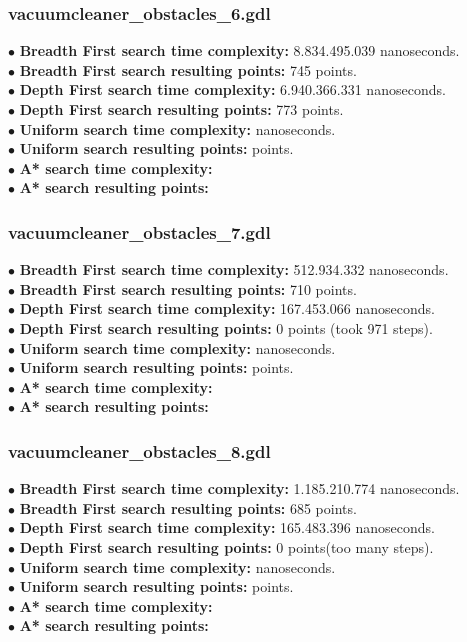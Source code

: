 \documentclass[11pt]{article}
\begin{document}
\subsubsection{vacuumcleaner\_obstacles\_6.gdl}
$\bullet$ {\bf Breadth First search time complexity: } 8.834.495.039 nanoseconds.  \\
$\bullet$ {\bf Breadth First search resulting points: } 745 points. \\
$\bullet$ {\bf Depth First search time complexity: } 6.940.366.331 nanoseconds. \\
$\bullet$ {\bf Depth First search resulting points: } 773 points. \\
$\bullet$ {\bf Uniform search time complexity: } nanoseconds. \\
$\bullet$ {\bf Uniform search resulting points: } points. \\
$\bullet$ {\bf A* search time complexity: } \\ 
$\bullet$ {\bf A* search resulting points: }\\

\subsubsection{vacuumcleaner\_obstacles\_7.gdl}
$\bullet$ {\bf Breadth First search time complexity: } 512.934.332 nanoseconds.\\
$\bullet$ {\bf Breadth First search resulting points: } 710 points. \\
$\bullet$ {\bf Depth First search time complexity: } 167.453.066 nanoseconds. \\
$\bullet$ {\bf Depth First search resulting points: } 0 points (took 971 steps). \\
$\bullet$ {\bf Uniform search time complexity: } nanoseconds. \\
$\bullet$ {\bf Uniform search resulting points: } points. \\
$\bullet$ {\bf A* search time complexity: } \\ 
$\bullet$ {\bf A* search resulting points: }\\

\subsubsection{vacuumcleaner\_obstacles\_8.gdl}
$\bullet$ {\bf Breadth First search time complexity: } 1.185.210.774 nanoseconds.\\
$\bullet$ {\bf Breadth First search resulting points: } 685 points.\\
$\bullet$ {\bf Depth First search time complexity: } 165.483.396 nanoseconds. \\
$\bullet$ {\bf Depth First search resulting points: } 0 points(too many steps). \\
$\bullet$ {\bf Uniform search time complexity: } nanoseconds. \\
$\bullet$ {\bf Uniform search resulting points: } points. \\
$\bullet$ {\bf A* search time complexity: } \\ 
$\bullet$ {\bf A* search resulting points: }\\
\end{document}
